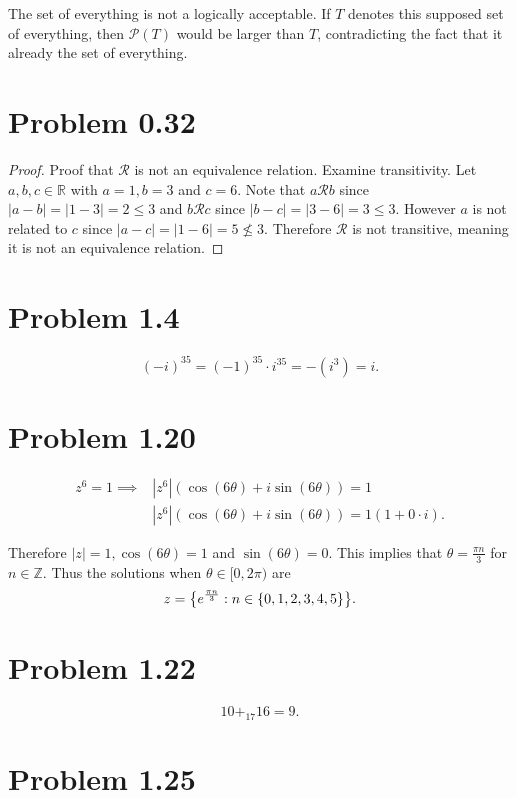 \documentclass[12pt]{extarticle}
\newcommand{\powerset}[1]{\mathcal{P}(#1)}
\begin{document}
The set of everything is not a logically acceptable. If $T$ denotes this supposed set of everything, then $\powerset{T}$ would be larger than $T$, contradicting the fact that it already the set of everything.

\section*{Problem 0.32}

\begin{proof}
	Proof that $\mathcal{R}$ is not an equivalence relation. Examine transitivity. Let $a,b,c \in \mathbb{R}$ with $a = 1, b = 3$ and $c = 6$. Note that $a \mathcal{R} b$ since $|a - b| = |1 - 3| = 2 \leq 3$ and $b \mathcal{R} c$ since $|b - c| = |3 - 6| = 3 \leq 3$. However $a$ is not related to $c$ since $|a - c| = |1 - 6| = 5 \nleq 3$. Therefore $\mathcal{R}$ is not transitive, meaning it is not an equivalence relation.
\end{proof}

\section*{Problem 1.4}
\[
	(-i)^{35} = (-1)^{35} \cdot i^{35} = -(i^3) = i
.\]

\section*{Problem 1.20}

\begin{align*}
	z^6 = 1 \implies &|z^6| (\cos(6\theta) + i \sin(6\theta)) = 1 \\
	&|z^6| (\cos(6\theta) + i \sin(6\theta)) = 1(1 + 0\cdot i)
.\end{align*}

Therefore $|z| = 1, \cos(6\theta) = 1$ and $\sin(6\theta) = 0$. This implies that $\theta = \frac{\pi n}{3}$ for $n \in \mathbb{Z}$. Thus the solutions when $\theta \in [0, 2\pi)$ are
\[
	z = \qty{e^{\frac{\pi n}{3}} : n \in \qty{0,1,2,3,4,5}}
.\]

\section*{Problem 1.22}
\[
	10 +_{17} 16 = 9
.\]

\section*{Problem 1.25}
\end{document}
